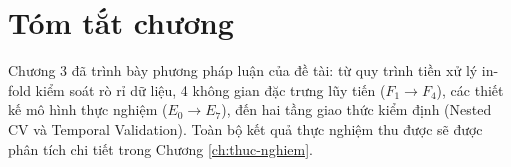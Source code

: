 \section{Tóm tắt chương}
\label{sec:tom-tat-chuong-3}

Chương 3 đã trình bày phương pháp luận của đề tài: từ quy trình tiền xử lý in-fold kiểm soát rò rỉ dữ liệu, 4 không gian đặc trưng lũy tiến ($F_1 \to F_4$), các thiết kế mô hình thực nghiệm ($E_0 \to E_7$), đến hai tầng giao thức kiểm định (Nested CV và Temporal Validation). Toàn bộ kết quả thực nghiệm thu được sẽ được phân tích chi tiết trong Chương \ref{ch:thuc-nghiem}.
